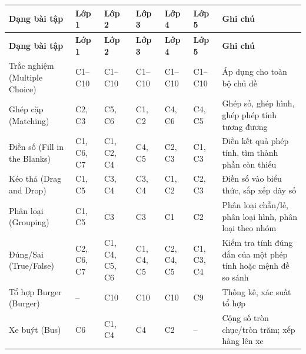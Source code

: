 \renewcommand{\arraystretch}{1.35}
\begin{longtable}{|m{3.5cm}|>{\centering\arraybackslash}m{1.5cm}|>{\centering\arraybackslash}m{1.5cm}|>{\centering\arraybackslash}m{1.5cm}|>{\centering\arraybackslash}m{1.5cm}|>{\centering\arraybackslash}m{1.5cm}|m{3.5cm}|}
	\hline
	\textbf{Dạng bài tập} & \textbf{Lớp 1} & \textbf{Lớp 2} & \textbf{Lớp 3} & \textbf{Lớp 4} & \textbf{Lớp 5} & \textbf{Ghi chú} \\
	\hline
	\endfirsthead
	\hline
	\textbf{Dạng bài tập} & \textbf{Lớp 1} & \textbf{Lớp 2} & \textbf{Lớp 3} & \textbf{Lớp 4} & \textbf{Lớp 5} & \textbf{Ghi chú} \\
	\hline
	\endhead
	\hline
	\endfoot

	Trắc nghiệm \newline (Multiple Choice)
	& C1--C10 & C1--C10 & C1--C10 & C1--C10 & C1--C10
	& Áp dụng cho toàn bộ chủ đề \\
	\hline

	Ghép cặp \newline (Matching)
	& C2, C3 & C5, C6 & C1, C2 & C4, C6 & C4, C5
	& Ghép số, ghép hình, ghép phép tính tương đương \\
	\hline

	Điền số \newline (Fill in the Blanks)
	& C1, C6, C7 & C1, C2, C4 & C4, C5 & C2, C3 & C1, C3
	& Điền kết quả phép tính, tìm thành phần còn thiếu \\
	\hline

	Kéo thả \newline (Drag and Drop)
	& C1, C5 & C3, C4 & C3, C4 & C1, C2 & C2, C3
	& Điền số vào biểu thức, sắp xếp dãy số \\
	\hline

	Phân loại \newline (Grouping)
	& C1, C5 & C3 & C3 & C1 & C2
	& Phân loại chẵn/lẻ, phân loại hình, phân loại theo nhóm \\
	\hline

	Đúng/Sai \newline (True/False)
	& C2, C6, C7 & C1, C4, C5, C6 & C1, C4, C5 & C2, C4, C5 & C1, C3, C4
	& Kiểm tra tính đúng đắn của một phép tính hoặc mệnh đề so sánh \\
	\hline

	Tổ hợp Burger \newline (Burger)
	& -- & C10 & C10 & C10 & C9
	& Thống kê, xác suất tổ hợp \\
	\hline

	Xe buýt \newline (Bus)
	& C6 & C1, C4 & C4 & C2 & --
	& Cộng số tròn chục/tròn trăm; xếp hàng lên xe \\
	\hline


\end{longtable}
